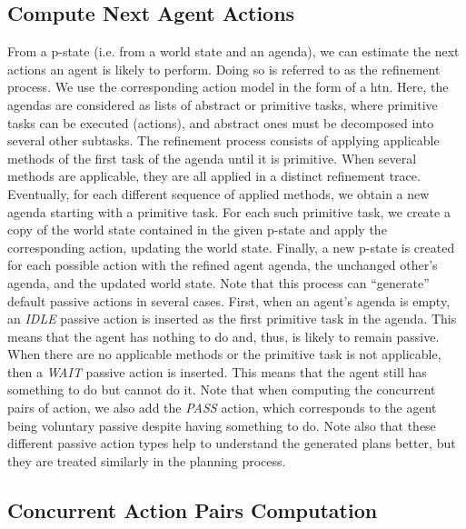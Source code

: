     \subsection{Compute Next Agent Actions}

From a p-state (i.e. from a world state and an agenda), we can estimate the next actions an agent is likely to perform. Doing so is referred to as the refinement process. We use the corresponding action model in the form of a \acrfull{htn}. Here, the agendas are considered as lists of abstract or primitive tasks, where primitive tasks can be executed (actions), and abstract ones must be decomposed into several other subtasks. 
The refinement process consists of applying applicable methods of the first task of the agenda until it is primitive. When several methods are applicable, they are all applied in a distinct refinement trace.
Eventually, for each different sequence of applied methods, we obtain a new agenda starting with a primitive task. For each such primitive task, we create a copy of the world state contained in the given p-state and apply the corresponding action, updating the world state. 
Finally, a new p-state is created for each possible action with the refined agent agenda, the unchanged other's agenda, and the updated world state. 
Note that this process can ``generate'' default passive actions in several cases. First, when an agent's agenda is empty, an \textit{IDLE} passive action is inserted as the first primitive task in the agenda. This means that the agent has nothing to do and, thus, is likely to remain passive. When there are no applicable methods or the primitive task is not applicable, then a \textit{WAIT} passive action is inserted. This means that the agent still has something to do but cannot do it. Note that when computing the concurrent pairs of action, we also add the \textit{PASS} action, which corresponds to the agent being voluntary passive despite having something to do. Note also that these different passive action types help to understand the generated plans better, but they are treated similarly in the planning process.

    \subsection{Concurrent Action Pairs Computation}

